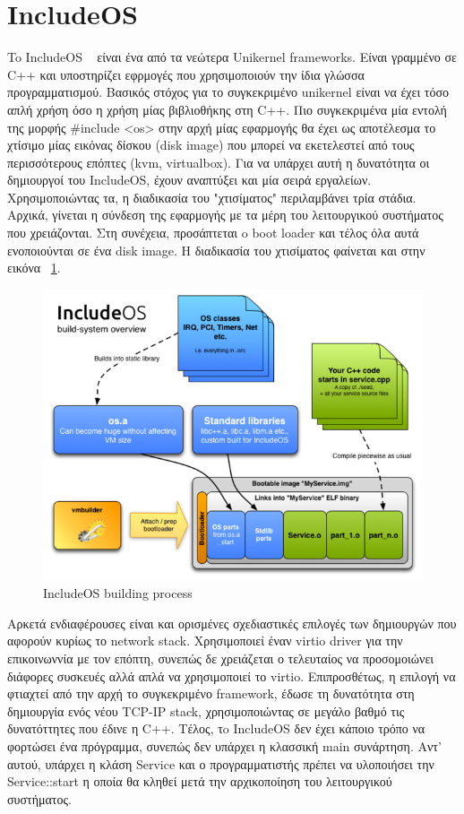 \section{IncludeOS}
To IncludeOS ~\cite{bratterud2015includeos} είναι ένα από τα νεώτερα Unikernel
frameworks. Είναι γραμμένο σε C++ και υποστηρίζει εφρμογές που χρησιμοποιούν την
ίδια γλώσσα προγραμματισμού. Βασικός στόχος για το συγκεκριμένο unikernel είναι
να έχει τόσο απλή χρήση όσο η χρήση μίας βιβλιοθήκης στη C++. Πιο συγκεκριμένα
μία εντολή της μορφής \#include <os> στην αρχή μίας εφαρμογής θα έχει ως
αποτέλεσμα το χτίσιμο μίας εικόνας δίσκου (disk image) που μπορεί να εκετελεστεί
από τους περισσότερους επόπτες (kvm, virtualbox). Για να υπάρχει αυτή η
δυνατότητα οι δημιουργοί του IncludeOS, έχουν αναπτύξει και μία σειρά εργαλείων.
Χρησιμοποιώντας τα, η διαδικασία του "χτισίματος" περιλαμβάνει τρία στάδια.
Αρχικά, γίνεται η σύνδεση της εφαρμογής με τα μέρη του λειτουργικού συστήματος
που χρειάζονται. Στη συνέχεια, προσάπτεται o boot loader και τέλος όλα αυτά
ενοποιούνται σε ένα disk image. Η διαδικασία του χτισίματος φαίνεται και στην
εικόνα ~\ref{fig3_5}. 

\begin{figure}[htp]
\centering
\includegraphics[scale=0.6]{figures/includeos_buil_system.png}
\caption{IncludeOS building process\label{fig3_5}}
\end{figure}

Αρκετά ενδιαφέρουσες είναι και ορισμένες σχεδιαστικές επιλογές των δημιουργών
που αφορούν κυρίως το network stack. Χρησιμοποιεί έναν virtio driver για την
επικοινωννία με τον επόπτη, συνεπώς δε χρειάζεται ο τελευταίος να προσομοιώνει
διάφορες συσκευές αλλά απλά να χρησιμοποιεί το virtio. Επιπροσθέτως, η επιλογή
να φτιαχτεί από την αρχή το συγκεκριμένο framework, έδωσε τη δυνατότητα στη
δημιουργία ενός νέου TCP-IP stack, χρησιμοποιώντας σε μεγάλο βαθμό τις
δυνατόττητες που έδινε η C++. Τέλος, τo IncludeOS δεν έχει κάποιο τρόπο να
φορτώσει ένα πρόγραμμα, συνεπώς δεν υπάρχει η κλασσική main συνάρτηση. Αντ'
αυτού, υπάρχει η κλάση Service και ο προγραμματιστής πρέπει να υλοποιήσει την
Service::start η οποία θα κληθεί μετά την αρχικοποίηση του λειτουργικού
συστήματος. 

